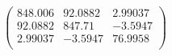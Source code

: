 \documentclass{article}
\begin{document}
\[\left(
\begin{array}{ccc}
 848.006 & 92.0882 & 2.99037 \\
 92.0882 & 847.71 & -3.5947 \\
 2.99037 & -3.5947 & 76.9958 \\
\end{array}
\right)\]
\end{document}
